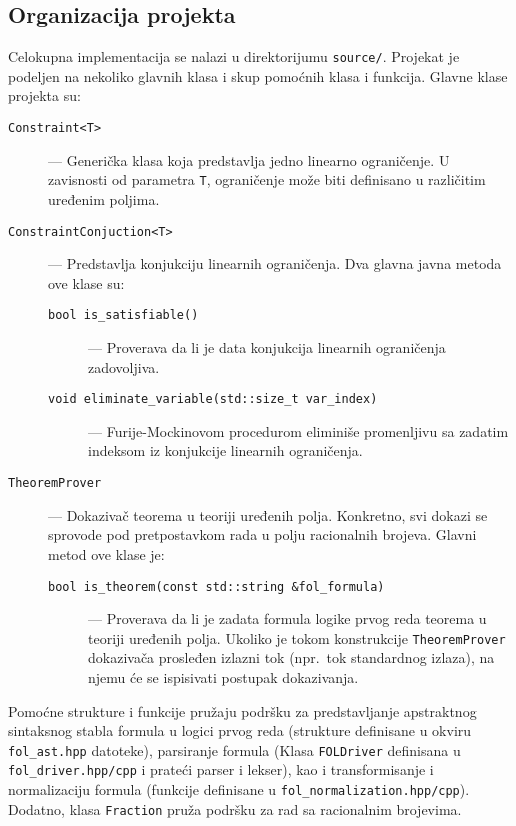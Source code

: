 \documentclass[a4paper,10pt]{article}
\begin{document}
\subsection{Organizacija projekta}

Celokupna implementacija se nalazi u direktorijumu \texttt{source/}. Projekat je podeljen na nekoliko glavnih klasa i skup pomoćnih klasa i funkcija. Glavne klase projekta su:

\begin{description}
    \item[\texttt{Constraint<T>}] --- Generička klasa koja predstavlja jedno linearno ograničenje. U zavisnosti od parametra \texttt{T}, ograničenje može biti definisano u različitim uređenim poljima.
    \item[\texttt{ConstraintConjuction<T>}] --- Predstavlja konjukciju linearnih ograničenja. Dva glavna javna metoda ove klase su:
        \begin{description}
            \item[\texttt{bool is\_satisfiable()}] --- Proverava da li je data konjukcija linearnih ograničenja zadovoljiva.
            \item[\texttt{void eliminate\_variable(std::size\_t var\_index)}] --- Furije-Mockinovom procedurom eliminiše promenljivu sa zadatim indeksom iz konjukcije linearnih ograničenja.
        \end{description}
    \item[\texttt{TheoremProver}] --- Dokazivač teorema u teoriji uređenih polja. Konkretno, svi dokazi se sprovode pod pretpostavkom rada u polju racionalnih brojeva. Glavni metod ove klase je:
    \begin{description}
        \item[\texttt{bool is\_theorem(const std::string \&fol\_formula)}] --- Proverava da li je zadata formula logike prvog reda teorema u teoriji uređenih polja. Ukoliko je tokom konstrukcije \texttt{TheoremProver} dokazivača prosleđen izlazni tok (npr.~tok standardnog izlaza), na njemu će se ispisivati postupak dokazivanja.
    \end{description}
\end{description}

Pomoćne strukture i funkcije pružaju podršku za predstavljanje apstraktnog sintaksnog stabla formula u logici prvog reda (strukture definisane u okviru \texttt{fol\_ast.hpp} datoteke), parsiranje formula (Klasa \texttt{FOLDriver} definisana u \texttt{fol\_driver.hpp/cpp} i prateći parser i lekser), kao i transformisanje i normalizaciju formula (funkcije definisane u \texttt{fol\_normalization.hpp/cpp}). Dodatno, klasa \texttt{Fraction} pruža podršku za rad sa racionalnim brojevima.
\end{document}
